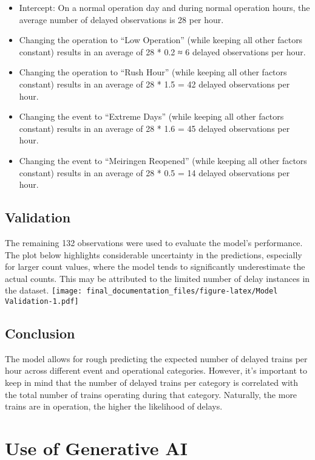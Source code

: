 \documentclass[
]{article}
\begin{document}
\begin{itemize}
\item
  Intercept: On a normal operation day and during normal operation
  hours, the average number of delayed observations is 28 per hour.
\item
  Changing the operation to ``Low Operation'' (while keeping all other
  factors constant) results in an average of 28 * 0.2 ≈ 6 delayed
  observations per hour.
\item
  Changing the operation to ``Rush Hour'' (while keeping all other
  factors constant) results in an average of 28 * 1.5 = 42 delayed
  observations per hour.
\item
  Changing the event to ``Extreme Days'' (while keeping all other
  factors constant) results in an average of 28 * 1.6 = 45 delayed
  observations per hour.
\item
  Changing the event to ``Meiringen Reopened'' (while keeping all other
  factors constant) results in an average of 28 * 0.5 = 14 delayed
  observations per hour.
\end{itemize}

\subsection{Validation}\label{validation}

The remaining 132 observations were used to evaluate the model's
performance. The plot below highlights considerable uncertainty in the
predictions, especially for larger count values, where the model tends
to significantly underestimate the actual counts. This may be attributed
to the limited number of delay instances in the dataset.
\texttt{[image: final\_documentation\_files/figure-latex/Model Validation-1.pdf]}

\subsection{Conclusion}\label{conclusion}

The model allows for rough predicting the expected number of delayed
trains per hour across different event and operational categories.
However, it's important to keep in mind that the number of delayed
trains per category is correlated with the total number of trains
operating during that category. Naturally, the more trains are in
operation, the higher the likelihood of delays.

\section{Use of Generative AI}\label{use-of-generative-ai}
\end{document}
